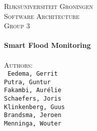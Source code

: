 
\begin{titlepage}

\center
\textsc{\LARGE Rijksuniversiteit Groningen}\\[1.5cm] %
\textsc{\Large Software Architecture}\\[0.5cm] %
\textsc{\large Group 3}\\[0.5cm] %


\HRule \\[0.4cm]
{ \huge \bfseries Smart Flood Monitoring}\\[0.4cm] %
\HRule \\[1.5cm]


\textsc{\Large Authors:}\\
\texttt{
Eedema, Gerrit\\
Putra, Guntur\\
Fakambi, Aur\'{e}lie\\
Schaefers, Joris\\
Klinkenberg, Guus\\
Brandsma, Jeroen\\
Menninga, Wouter
}




\end{titlepage}